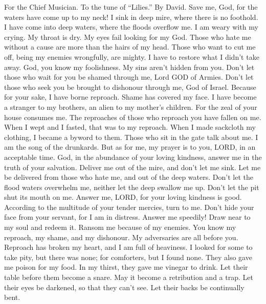 For the Chief Musician. To the tune of ``Lilies.'' By David.
 Save me, God, for the waters have come up to my neck!
 I sink in deep mire, where there is no foothold. I have
come into deep waters, where the floods overflow me.  I am
weary with my crying. My throat is dry. My eyes fail looking for my God.
 Those who hate me without a cause are more than the hairs
of my head. Those who want to cut me off, being my enemies wrongfully,
are mighty. I have to restore what I didn't take away. 
God, you know my foolishness. My sins aren't hidden from you.
 Don't let those who wait for you be shamed through me,
Lord GOD of Armies. Don't let those who seek you be brought to dishonour
through me, God of Israel.  Because for your sake, I have
borne reproach. Shame has covered my face.  I have become
a stranger to my brothers, an alien to my mother's children.
 For the zeal of your house consumes me. The reproaches of
those who reproach you have fallen on me.  When I wept
and I fasted, that was to my reproach.  When I made
sackcloth my clothing, I became a byword to them.  Those
who sit in the gate talk about me. I am the song of the drunkards.
 But as for me, my prayer is to you, LORD, in an
acceptable time. God, in the abundance of your loving kindness, answer
me in the truth of your salvation.  Deliver me out of the
mire, and don't let me sink. Let me be delivered from those who hate me,
and out of the deep waters.  Don't let the flood waters
overwhelm me, neither let the deep swallow me up. Don't let the pit shut
its mouth on me.  Answer me, LORD, for your loving
kindness is good. According to the multitude of your tender mercies,
turn to me.  Don't hide your face from your servant, for
I am in distress. Answer me speedily!  Draw near to my
soul and redeem it. Ransom me because of my enemies.  You
know my reproach, my shame, and my dishonour. My adversaries are all
before you.  Reproach has broken my heart, and I am full
of heaviness. I looked for some to take pity, but there was none; for
comforters, but I found none.  They also gave me poison
for my food. In my thirst, they gave me vinegar to drink.
 Let their table before them become a snare. May it
become a retribution and a trap.  Let their eyes be
darkened, so that they can't see. Let their backs be continually bent.
